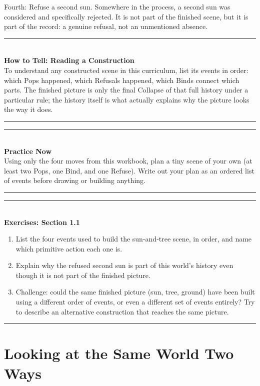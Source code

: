\documentclass[11pt]{book}
\newenvironment{algorithmproc}[1]{\vspace{0.6em}\noindent\rule{\linewidth}{0.6pt}\\[0.2em]\textbf{How to Tell: #1}\\[0.3em]}{\\[0.2em]\noindent\rule{\linewidth}{0.6pt}\vspace{0.6em}}
\newenvironment{practicenow}{\vspace{0.6em}\noindent\rule{\linewidth}{0.6pt}\\[0.2em]\textbf{Practice Now}\\[0.3em]}{\\[0.2em]\noindent\rule{\linewidth}{0.6pt}\vspace{0.6em}}
\newenvironment{exercisebox}[1]{\vspace{0.8em}\noindent\rule{\linewidth}{0.6pt}\\[0.2em]\textbf{Exercises: #1}\\[0.3em]\begin{enumerate}[label=\arabic*., itemsep=0.4em]}{\end{enumerate}\noindent\rule{\linewidth}{0.6pt}\vspace{0.6em}}
\begin{document}
Fourth: Refuse a second sun. Somewhere in the process, a second sun was considered and specifically rejected. It is not part of the finished scene, but it is part of the record: a genuine refusal, not an unmentioned absence.

\begin{center}
\end{center}

\begin{algorithmproc}{Reading a Construction}
To understand any constructed scene in this curriculum, list its events in order: which Pops happened, which Refusals happened, which Binds connect which parts. The finished picture is only the final Collapse of that full history under a particular rule; the history itself is what actually explains why the picture looks the way it does.
\end{algorithmproc}

\begin{practicenow}
Using only the four moves from this workbook, plan a tiny scene of your own (at least two Pops, one Bind, and one Refuse). Write out your plan as an ordered list of events before drawing or building anything.
\end{practicenow}

\begin{exercisebox}{Section 1.1}
\item List the four events used to build the sun-and-tree scene, in order, and name which primitive action each one is.
\item Explain why the refused second sun is part of this world's history even though it is not part of the finished picture.
\item Challenge: could the same finished picture (sun, tree, ground) have been built using a different order of events, or even a different set of events entirely? Try to describe an alternative construction that reaches the same picture.
\end{exercisebox}

\chapter{Looking at the Same World Two Ways}
\end{document}
